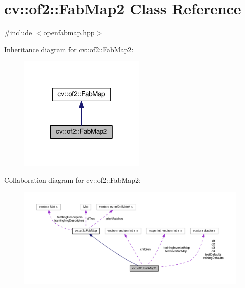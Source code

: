 \hypertarget{classcv_1_1of2_1_1FabMap2}{\section{cv\-:\-:of2\-:\-:Fab\-Map2 Class Reference}
\label{classcv_1_1of2_1_1FabMap2}
}


{\ttfamily \#include $<$openfabmap.\-hpp$>$}



Inheritance diagram for cv\-:\-:of2\-:\-:Fab\-Map2\-:\nopagebreak
\begin{figure}[H]
\begin{center}
\leavevmode
\includegraphics[width=172pt]{classcv_1_1of2_1_1FabMap2__inherit__graph}
\end{center}
\end{figure}


Collaboration diagram for cv\-:\-:of2\-:\-:Fab\-Map2\-:\nopagebreak
\begin{figure}[H]
\begin{center}
\leavevmode
\includegraphics[width=350pt]{classcv_1_1of2_1_1FabMap2__coll__graph}
\end{center}
\end{figure}
